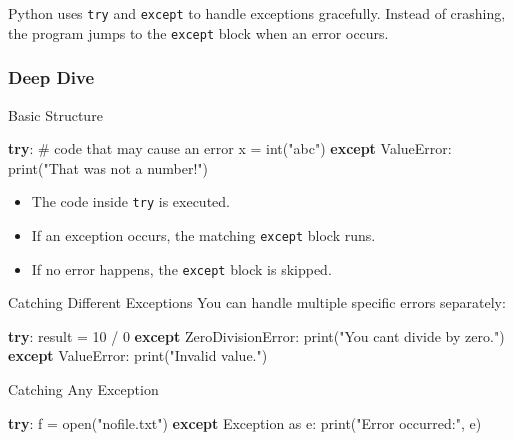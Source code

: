 \documentclass[
  letterpaper,
  DIV=11,
  numbers=noendperiod]{scrreprt}
\newenvironment{Shaded}{\begin{snugshade}}{\end{snugshade}}
\newcommand{\BuiltInTok}[1]{\textcolor[rgb]{0.00,0.23,0.31}{#1}}
\newcommand{\CommentTok}[1]{\textcolor[rgb]{0.37,0.37,0.37}{#1}}
\newcommand{\ControlFlowTok}[1]{\textcolor[rgb]{0.00,0.23,0.31}{\textbf{#1}}}
\newcommand{\DecValTok}[1]{\textcolor[rgb]{0.68,0.00,0.00}{#1}}
\newcommand{\ImportTok}[1]{\textcolor[rgb]{0.00,0.46,0.62}{#1}}
\newcommand{\NormalTok}[1]{\textcolor[rgb]{0.00,0.23,0.31}{#1}}
\newcommand{\OperatorTok}[1]{\textcolor[rgb]{0.37,0.37,0.37}{#1}}
\newcommand{\PreprocessorTok}[1]{\textcolor[rgb]{0.68,0.00,0.00}{#1}}
\newcommand{\StringTok}[1]{\textcolor[rgb]{0.13,0.47,0.30}{#1}}
\providecommand{\tightlist}{%
  \setlength{\itemsep}{0pt}\setlength{\parskip}{0pt}}
\begin{document}
Python uses \texttt{try} and \texttt{except} to handle exceptions
gracefully. Instead of crashing, the program jumps to the
\texttt{except} block when an error occurs.

\subsubsection{Deep Dive}\label{deep-dive-72}

Basic Structure

\begin{Shaded}
\begin{Highlighting}[]
\ControlFlowTok{try}\NormalTok{:}
    \CommentTok{\# code that may cause an error}
\NormalTok{    x }\OperatorTok{=} \BuiltInTok{int}\NormalTok{(}\StringTok{"abc"}\NormalTok{)}
\ControlFlowTok{except} \PreprocessorTok{ValueError}\NormalTok{:}
    \BuiltInTok{print}\NormalTok{(}\StringTok{"That was not a number!"}\NormalTok{)}
\end{Highlighting}
\end{Shaded}

\begin{itemize}
\tightlist
\item
  The code inside \texttt{try} is executed.
\item
  If an exception occurs, the matching \texttt{except} block runs.
\item
  If no error happens, the \texttt{except} block is skipped.
\end{itemize}

Catching Different Exceptions You can handle multiple specific errors
separately:

\begin{Shaded}
\begin{Highlighting}[]
\ControlFlowTok{try}\NormalTok{:}
\NormalTok{    result }\OperatorTok{=} \DecValTok{10} \OperatorTok{/} \DecValTok{0}
\ControlFlowTok{except} \PreprocessorTok{ZeroDivisionError}\NormalTok{:}
    \BuiltInTok{print}\NormalTok{(}\StringTok{"You can\textquotesingle{}t divide by zero."}\NormalTok{)}
\ControlFlowTok{except} \PreprocessorTok{ValueError}\NormalTok{:}
    \BuiltInTok{print}\NormalTok{(}\StringTok{"Invalid value."}\NormalTok{)}
\end{Highlighting}
\end{Shaded}

Catching Any Exception

\begin{Shaded}
\begin{Highlighting}[]
\ControlFlowTok{try}\NormalTok{:}
\NormalTok{    f }\OperatorTok{=} \BuiltInTok{open}\NormalTok{(}\StringTok{"nofile.txt"}\NormalTok{)}
\ControlFlowTok{except} \PreprocessorTok{Exception} \ImportTok{as}\NormalTok{ e:}
    \BuiltInTok{print}\NormalTok{(}\StringTok{"Error occurred:"}\NormalTok{, e)}
\end{Highlighting}
\end{Shaded}
\end{document}
